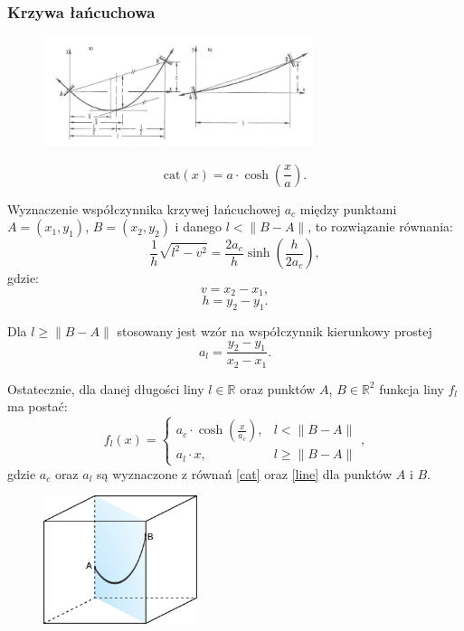 \documentclass[aspectratio=169]{beamer}
\begin{document}
\begin{frame}[allowframebreaks]
	\frametitle{Krzywa łańcuchowa}
	\begin{figure}
		\centering
		\includegraphics[width=0.7\textwidth]{catenary.jpg}
	\end{figure}
	$$\text{cat}(x) = a\cdot \cosh \left(\frac{x}{a}\right).$$
	
	\framebreak
	
	Wyznaczenie współczynnika krzywej łańcuchowej $a_c$ między punktami $A = (x_1,y_1)$, $B = (x_2,y_2)$ i danego $l < \lVert B - A \rVert$, to rozwiązanie równania:
	\begin{equation}
		\label{cat}
		\frac{1}{h} \sqrt{l^2-v^2} = \frac{2a_c}{h} \sinh\left( \frac{h}{2a_c} \right),
	\end{equation}
	gdzie:
	$$
	v = x_2 - x_1,
	$$
	$$
	h = y_2 - y_1.
	$$
	
	\framebreak
	Dla $l \geq \lVert B - A \rVert$ stosowany jest wzór na współczynnik kierunkowy prostej
	\begin{equation}
		\label{line}
		a_l = \frac{y_2 - y_1}{x_2 - x_1}.
	\end{equation}
	
	
	\framebreak
	Ostatecznie, dla danej długości liny $l \in \mathbb{R}$ oraz punktów $A$, $B  \in \mathbb{R}^2$ funkcja liny $f_l$ ma postać:
	$$f_l(x) = 
	\begin{cases}
		a_c \cdot \cosh\left( \frac{x}{a_c} \right), & l < \lVert B - A \rVert \\
		a_l \cdot x, & l \geq \lVert B - A \rVert 
	\end{cases},$$
	gdzie $a_c$ oraz $a_l$ są wyznaczone z równań \ref{cat} oraz \ref{line} dla punktów $A$ i $B$.
	
	\framebreak
	
	\begin{figure}
		\centering
		\includegraphics[width=0.4\textwidth]{cube.png}
	\end{figure}
	\framebreak
	

\end{frame}
\end{document}
